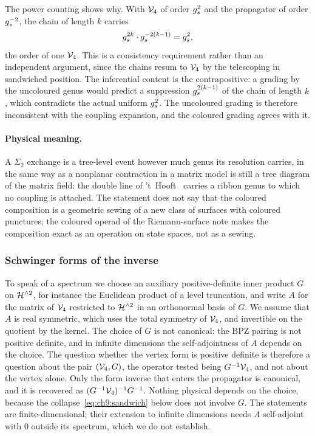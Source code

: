 The power counting shows why.
With $\mathcal{V}_{4}$ of order $g_s^2$ and the propagator of order $g_s^{-2}$, the chain of length $k$ carries
\begin{equation}
  \label{eq:ch9:chain-coupling}
  g_s^{2 k} \cdot g_s^{- 2 (k - 1)}
    = g_s^2,
\end{equation}
the order of one $\mathcal{V}_{4}$.
This is a consistency requirement rather than an independent argument, since the chains resum to $\mathcal{V}_{4}$ by the telescoping in sandwiched position.
The inferential content is the contrapositive: a grading by the uncoloured genus would predict a suppression $g_s^{2 (k - 1)}$ of the chain of length $k$, which contradicts the actual uniform $g_s^2$.
The uncoloured grading is therefore inconsistent with the coupling expansion, and the coloured grading agrees with it.

\paragraph{Physical meaning.}
A $\Sigma_2$ exchange is a tree-level event however much genus its resolution carries, in the same way as a nonplanar contraction in a matrix model is still a tree diagram of the matrix field: the double line of 't~Hooft~\cite{tHooft1974} carries a ribbon genus to which no coupling is attached.
The statement does not say that the coloured composition is a geometric sewing of a new class of surfaces with coloured punctures; the coloured operad of the Riemann-surface note makes the composition exact as an operation on state spaces, not as a sewing.

\subsubsection{Schwinger forms of the inverse}
\label{sec:ws1:schwinger}

To speak of a spectrum we choose an auxiliary positive-definite inner product $G$ on $\mathcal{H}^{\wedge 2}$, for instance the Euclidean product of a level truncation, and write $A$ for the matrix of $\mathcal{V}_{4}$ restricted to $\mathcal{H}^{\wedge 2}$ in an orthonormal basis of $G$.
We assume that $A$ is real symmetric, which uses the total symmetry of $\mathcal{V}_{4}$, and invertible on the quotient by the kernel.
The choice of $G$ is not canonical: the BPZ pairing is not positive definite, and in infinite dimensions the self-adjointness of $A$ depends on the choice.
The question whether the vertex form is positive definite is therefore a question about the pair $(\mathcal{V}_{4}, G)$, the operator tested being $G^{-1} \mathcal{V}_{4}$, and not about the vertex alone.
Only the form inverse that enters the propagator is canonical, and it is recovered as $(G^{-1} \mathcal{V}_{4})^{-1} G^{-1}$.
Nothing physical depends on the choice, because the collapse~\eqref{eq:ch9:sandwich} below does not involve $G$.
The statements are finite-dimensional; their extension to infinite dimensions needs $A$ self-adjoint with $0$ outside its spectrum, which we do not establish.

